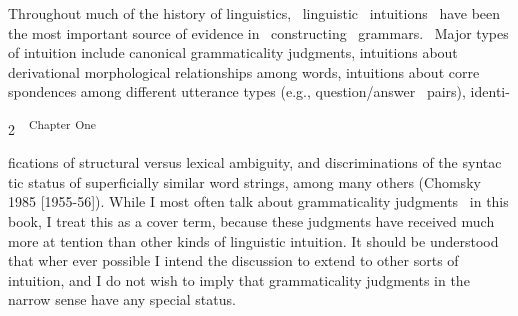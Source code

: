 \begin{styleStandard}
Throughout much of the history of linguistics, \ linguistic \ intuitions \ have been the most important source of evidence in \ constructing \ grammars. \ Major types of intuition include canonical grammaticality judgments, intuitions about derivational morphological relationships among words, intuitions about corre\- spondences among different utterance types (e.g., question/answer \ pairs), identi-
\end{styleStandard}


\clearpage\setcounter{page}{1}\begin{styleStandard}
2\ \ \textsuperscript{Chapter}\textsuperscript{ }\textsuperscript{One}
\end{styleStandard}


\begin{styleStandard}
fications of structural versus lexical ambiguity, and discriminations of the syntac\- tic status of superficially similar word strings, among many others (Chomsky 1985 [1955-56]). While I most often talk about grammaticality judgments \ in this book, I treat this as a cover term, because these judgments have received much more at\- tention than other kinds of linguistic intuition. It should be understood that wher\- ever possible I intend the discussion to extend to other sorts of intuition, and I do not wish to imply that grammaticality judgments in the narrow sense have any special status.
\end{styleStandard}


